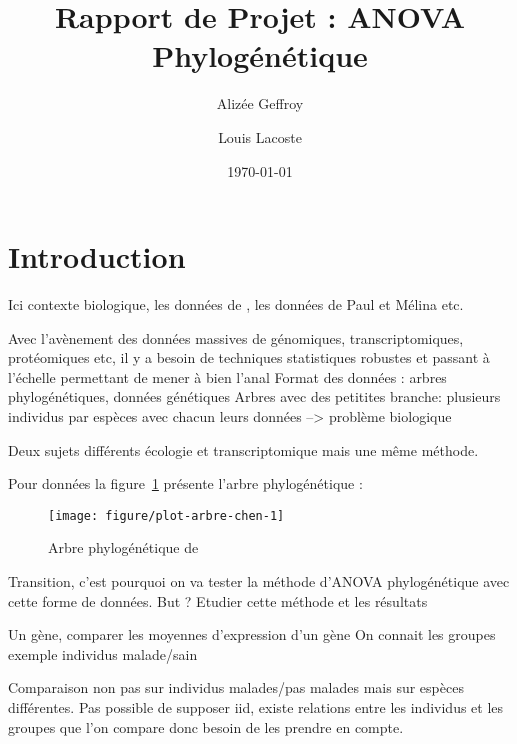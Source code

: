 \documentclass[a4paper, 12pt]{article}\usepackage[]{graphicx}\usepackage[]{xcolor}
\title{Rapport de Projet : ANOVA Phylogénétique}
\author{Alizée Geffroy \and Louis Lacoste}
\date{\today}
\makeatletter
\def\maxwidth{ %
  \ifdim\Gin@nat@width>\linewidth
    \linewidth
  \else
    \Gin@nat@width
  \fi
}
\newenvironment{knitrout}{}{} %
\makeatother
\begin{document}
\maketitle





\newpage
\tableofcontents
\newpage

\section{Introduction}
\label{chap:intro}
Ici contexte biologique, les données de \cite{gomez-mestrePhylogeneticAnalysesReveal2012}, les données de Paul et Mélina etc.

Avec l'avènement des données massives de génomiques, transcriptomiques, protéomiques etc, il y a besoin de techniques statistiques robustes et passant à l'échelle permettant de mener à bien l'anal
Format des données : arbres phylogénétiques, données génétiques 
Arbres avec des petitites branche: plusieurs individus par espèces avec chacun leurs données 
--> problème biologique 

Deux sujets différents écologie et transcriptomique mais une même méthode.

Pour données \cite{chenQuantitativeFrameworkCharacterizing2019} la figure~\ref{fig:arbre-chen2019} présente l'arbre phylogénétique :

\begin{figure}[!h]
    \centering
\begin{knitrout}
\color{fgcolor}
\texttt{[image: figure/plot-arbre-chen-1]} 
\end{knitrout}
    \caption{Arbre phylogénétique de \cite{chenQuantitativeFrameworkCharacterizing2019}}
    \label{fig:arbre-chen2019}
\end{figure}


Transition, c'est pourquoi on va tester la méthode d'ANOVA phylogénétique avec cette forme de données. 
But ? Etudier cette méthode et les résultats 

Un gène, comparer les moyennes d'expression d'un gène 
On connait les groupes
exemple individus malade/sain

Comparaison non pas sur individus malades/pas malades mais sur espèces différentes.
Pas possible de supposer iid, existe relations entre les individus et les groupes que l'on compare donc besoin de les prendre en compte.
\end{document}
